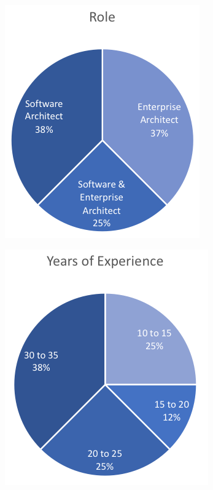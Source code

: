 \begin{figure}
   \begin{subfigure}{.5\linewidth}
      \centering
      \includegraphics[scale=1.0]{Figures/prioritisation-roles}
   \end{subfigure}
   \begin{subfigure}{.5\linewidth}
      \centering
      \includegraphics[scale=1.0]{Figures/prioritisation-yearsexp}
   \end{subfigure}
   \begin{subfigure}{\linewidth}
      \centering

\end{subfigure}
\end{figure}
